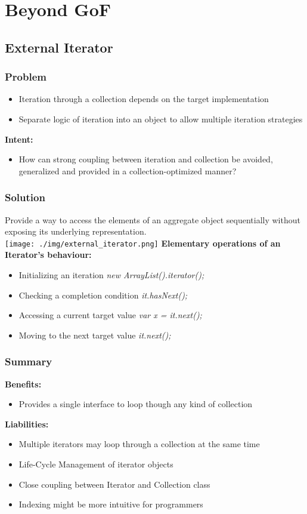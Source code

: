 
\section{Beyond GoF}
\subsection{External Iterator}
\subsubsection{Problem}
\begin{itemize}
    \item Iteration through a collection depends on the target implementation
    \item Separate logic of iteration into an object to allow multiple iteration strategies
\end{itemize}
\textbf{Intent:}
\begin{itemize}
    \item How can strong coupling between iteration and collection be avoided, generalized and provided in a collection-optimized manner?
\end{itemize}
\subsubsection{Solution}
Provide a way to access the elements of an aggregate object sequentially without exposing its underlying representation.\\ 
\texttt{[image: ./img/external\_iterator.png]}
\textbf{Elementary operations of an Iterator's behaviour:}
\begin{itemize}
    \item Initializing an iteration \textit{new ArrayList().iterator();}
    \item Checking a completion condition \textit{it.hasNext();}
    \item Accessing a current target value \textit{var x = it.next();}
    \item Moving to the next target value \textit{it.next();}
\end{itemize}
\subsubsection{Summary}
\textbf{Benefits:}
\begin{itemize}
    \item Provides a single interface to loop though any kind of collection
\end{itemize}
\textbf{Liabilities:}
\begin{itemize}
    \item Multiple iterators may loop through a collection at the same time
    \item Life-Cycle Management of iterator objects
    \item Close coupling between Iterator and Collection class
    \item Indexing might be more intuitive for programmers
\end{itemize}


